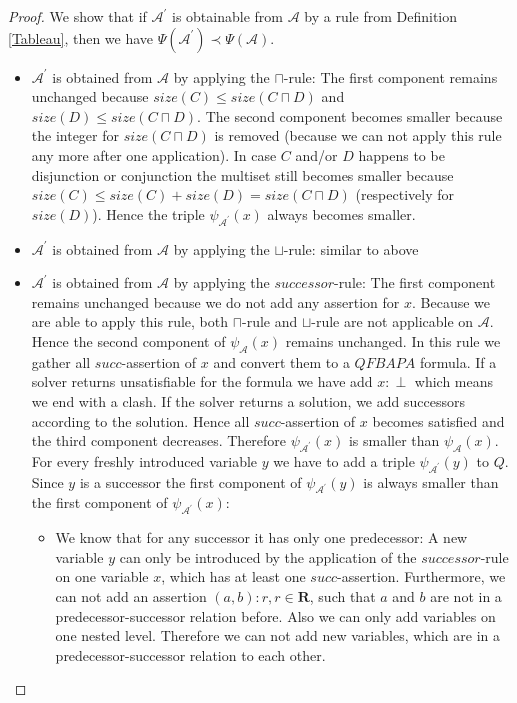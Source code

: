\documentclass{book}
\theoremstyle{break}
\theoremstyle{definition}
\begin{document}
\begin{proof}
We show that if $\mathcal{A}^\prime$ is obtainable from $\mathcal{A}$ by a rule from Definition \ref{Tableau}, then we have $\Psi(\mathcal{A}^\prime)\prec \Psi(\mathcal{A})$.\\
\begin{itemize}
\item $\mathcal{A}^\prime$ is obtained from $\mathcal{A}$ by applying the $\sqcap$-rule: The first component remains unchanged because $size(C)\leq size(C\sqcap D)$ and $size(D)\leq size(C\sqcap D)$. The second component becomes smaller because the integer for $size(C\sqcap D)$ is removed (because we can not apply this rule any more after one application). In case $C$ and/or $D$ happens to be disjunction or conjunction the multiset still becomes smaller because $size(C)\leq size(C)+size(D)=size(C\sqcap D)$ (respectively for $size(D)$). Hence the triple $\psi_{\mathcal{A}^\prime}(x)$ always becomes smaller.
\item $\mathcal{A}^\prime$ is obtained from $\mathcal{A}$ by applying the $\sqcup$-rule: similar to above
\item $\mathcal{A}^\prime$ is obtained from $\mathcal{A}$ by applying the $successor$-rule: The first component remains unchanged because we do not add any assertion for $x$.  Because we are able to apply this rule, both $\sqcap$-rule and $\sqcup$-rule are not applicable on $\mathcal{A}$. Hence the second component of $\psi_\mathcal{A}(x)$ remains unchanged. In this rule we gather all $succ$-assertion of $x$ and convert them to a $QFBAPA$ formula. If a solver returns unsatisfiable for the formula we have add $x:\perp$ which means we end with a clash. If the solver returns a solution, we add successors according to the solution. Hence all $succ$-assertion of $x$ becomes satisfied and the third component decreases. Therefore $\psi_{\mathcal{A}^\prime}(x)$ is smaller than $\psi_\mathcal{A}(x)$.\\
For every freshly introduced variable $y$ we have to add a triple $\psi_{\mathcal{A}^\prime}(y)$ to $Q$. Since $y$ is a successor the first component of $\psi_{\mathcal{A}^\prime}(y)$ is always smaller than the first component of $\psi_{\mathcal{A}^\prime}(x)$:
\begin{itemize}
\item We know that for any successor it has only one predecessor: A new variable $y$ can only be introduced by the application of the $successor$-rule on one variable $x$, which has at least one $succ$-assertion. Furthermore, we can not add an assertion $(a,b):r,r\in\mathbf{R}$, such that $a$ and $b$ are not in a predecessor-successor relation before. Also we can only add variables on one nested level. Therefore we can not add new variables, which are in a predecessor-successor relation to each other.

\end{itemize}
\end{itemize}
\end{proof}
\end{document}
